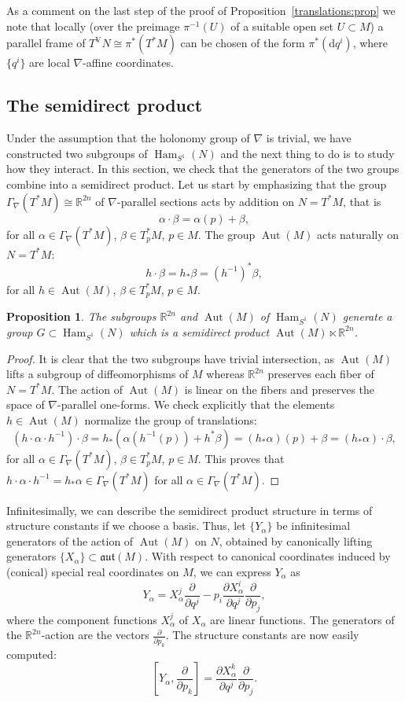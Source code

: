 \documentclass{article}
\newtheorem{proposition}[theorem]{Proposition}
\theoremstyle{definition}
\DeclareMathOperator{\Aut}{Aut}
\DeclareMathOperator{\Ham}{Ham}
\newcommand{\R}{\mathbb{R}}
\newcommand{\ver}{\mathrm{V}}
\newcommand{\aut}{\mathfrak{aut}}
\newcommand{\pd}[2]{\frac{\partial #1}{\partial #2}}
\renewcommand{\d}{\mathrm{d}}
\begin{document}
	As a comment on the last step of the proof of Proposition~\ref{translations:prop} we note that locally (over the preimage $\pi^{-1}(U)$ of a suitable open set $U\subset M$) a parallel frame of $T^\ver N\cong\pi^*(T^*M)$ can be chosen of the form $\pi^*(\d q^i)$, where $\{q^i\}$ are local $\nabla$-affine coordinates.
 
 \subsection{The semidirect product}\label{subsection:semidirect_product}
	
	Under the assumption that the holonomy group of $\nabla$ is trivial, we have constructed two subgroups of $\Ham_{S^1}(N)$ and the next thing to do is to study how they interact. In this section, we check that the generators of the two groups combine into a semidirect product. Let us start by emphasizing that the group $\Gamma_\nabla(T^*M)\cong\R^{2n}$ of $\nabla$-parallel sections acts by addition on $N=T^*M$, that is $$\alpha\cdot\beta=\alpha(p)+\beta,$$ for all $\alpha\in\Gamma_\nabla(T^*M)$, $\beta\in T_p^*M$, $p\in M$. The group $\Aut(M)$ acts naturally on $N=T^*M$: $$h\cdot\beta=h_*\beta=(h^{-1})^*\beta,$$ for all $h\in\Aut(M)$, $\beta\in T_p^*M$, $p\in M$.
	
	\begin{proposition}\label{prop:semidirect_Aut-R2n}
		The subgroups $\R^{2n}$ and $\Aut(M)$ of $\Ham_{S^1}(N)$ generate a group $G\subset\Ham_{S^1}(N)$ which is a semidirect product $\Aut(M)\ltimes\R^{2n}$.
	\end{proposition}

	\begin{proof}
		It is clear that the two subgroups have trivial intersection, as $\Aut(M)$ lifts a subgroup of diffeomorphisms of $M$ whereas $\R^{2n}$ preserves each fiber of $N=T^*M$. The action of $\Aut(M)$ is linear on the fibers and preserves the space of $\nabla$-parallel one-forms. We check explicitly that the elements $h\in\Aut(M)$ normalize the group of translations: $$(h\cdot\alpha\cdot h^{-1})\cdot\beta=h_*(\alpha(h^{-1}(p))+h^*\beta)=(h_*\alpha)(p)+\beta=(h_*\alpha)\cdot\beta,$$ for all $\alpha\in\Gamma_\nabla(T^*M)$, $\beta\in T_p^*M$, $p\in M$. This proves that $h\cdot\alpha\cdot h^{-1} =h_*\alpha\in\Gamma_\nabla(T^*M)$ for all $\alpha\in\Gamma_\nabla(T^*M)$.
        \end{proof}

	Infinitesimally, we can describe the semidirect product structure in terms of structure constants if we choose a basis. Thus, let $\{Y_\alpha\}$ be infinitesimal generators of the action of $\Aut(M)$ on $N$, obtained by canonically lifting generators $\{X_\alpha\}\subset\aut(M)$. With respect to canonical coordinates induced by (conical) special real coordinates on $M$, we can express $Y_\alpha$ as $$Y_\alpha=X_\alpha^j\pd{}{q^j}-p_i\pd{X_\alpha^i}{q^j}\pd{}{p_j},$$ where the component functions $X_\alpha^j$ of $X_\alpha$ are linear functions. The generators of the $\R^{2n}$-action are the vectors $\pd{}{p_k}$. The structure constants are now easily computed: $$\left[Y_\alpha,\pd{}{p_k}\right]=\pd{X_\alpha^k}{q^j}\pd{}{p_j}.$$
	
\end{document}
